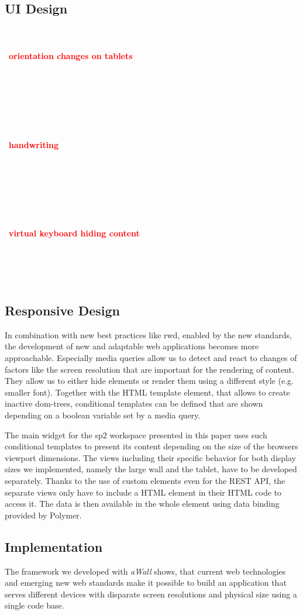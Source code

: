 \documentclass{sigchi}
\newcommand{\todo}[1]{~\\\\~\textbf{\large{\textcolor{red}{#1}}}\\~\\~\\~\\~}
\begin{document}
\subsection{UI Design}
\todo{orientation changes on tablets}


\todo{handwriting}

\todo{virtual keyboard hiding content}



\subsection{Responsive Design}
In combination with new best practices like \gls{rwd}, enabled by the new standards, the development of new and adaptable web applications becomes more approachable.
Especially media queries allow us to detect and react to changes of factors like the screen resolution that are important for the rendering of content.
They allow us to either hide elements or render them using a different style (e.g. smaller font).
Together with the HTML template element, that allows to create inactive \gls{dom}-trees, conditional templates can be defined that are shown depending on a boolean variable set by a media query.

The main widget for the \gls{sp2} workspace presented in this paper uses such conditional templates to present its content depending on the size of the browsers viewport dimensions.
The views including their specific behavior for both display sizes we implemented, namely the large wall and the tablet, have to be developed separately.
Thanks to the use of custom elements even for the REST API, the separate views only have to include a HTML element in their HTML code to access it.
The data is then available in the whole element using data binding provided by Polymer.


\subsection{Implementation}
The framework we developed with \textit{aWall} shows, that current web technologies and emerging new web standards make it possible to build an application that serves different devices with disparate screen resolutions and physical size using a single code base. 
\end{document}
